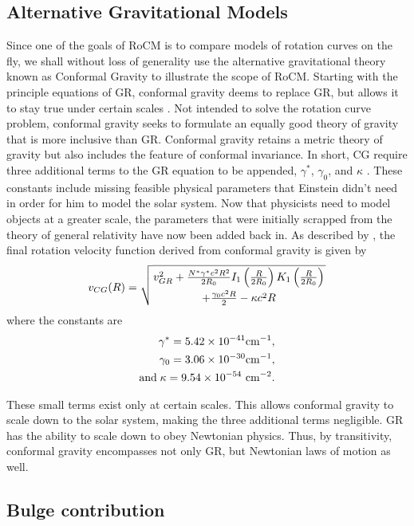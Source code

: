 \documentclass[conference]{IEEEtran-modified}
\providecommand{\e}[1]{\ensuremath{\times 10^{#1}}}
\begin{document}
\subsection{Alternative Gravitational Models}
Since one of the goals of RoCM is to compare models of rotation curves on the fly, we shall without loss of generality use the alternative gravitational theory known as Conformal Gravity to illustrate the scope of RoCM.  Starting with the principle equations of GR, conformal gravity deems to replace GR, but allows it to stay true under certain scales \cite{mannheim}. 
Not intended to solve the rotation curve problem, conformal gravity seeks to formulate an equally good theory of gravity that is more inclusive than GR. Conformal gravity retains a metric theory of gravity but also includes the feature of conformal invariance. In short, CG require three additional terms to the GR equation to be appended, $\gamma^*$, $\gamma_0$, and $\kappa$ \cite{mannheim}. These constants include missing feasible physical parameters that Einstein didn't need in order for him to model the solar system. Now that physicists need to model objects at a greater scale, the parameters that were initially scrapped from the theory of general relativity have now been added back in.
 As described by \cite{mannheim}, the final rotation velocity function derived from conformal gravity is given by
\begin{equation}
v_{CG}(R) = \sqrt{\genfrac{}{}{0pt}{}{v_{GR}^2+\frac{N^*\gamma^*c^2R^2}{2R_0}I_1\left(\frac{R}{2R_0}\right)K_1\left(\frac{R}{2R_0}\right)}{+\frac{\gamma_0c^2R}{2}-\kappa c^2R}}
\end{equation}
where the constants are
\begin{equation*}
\begin{split}
\gamma^*=5.42\e{-41} {\rm cm}^{-1}, \\ 
\gamma_0=3.06\e{-30} {\rm cm}^{-1}, \\ 
\text{and}\; \kappa=9.54\e{-54}~{\rm cm}^{-2}.
\end{split}
\end{equation*} 

These small terms exist only at certain scales. This allows conformal gravity to scale down to the solar system, making the three additional terms negligible. GR has the ability to scale down to obey Newtonian physics. Thus, by transitivity, conformal gravity encompasses not only GR, but Newtonian laws of motion as well.

\subsection{Bulge contribution}
\end{document}
